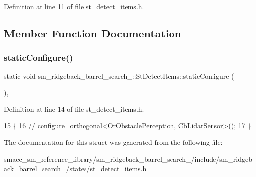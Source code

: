 Definition at line 11 of file st\+\_\+detect\+\_\+items.\+h.



\subsection{Member Function Documentation}
\mbox{\label{structsm__ridgeback__barrel__search__1_1_1StDetectItems_ac707db37c8932864cbf56191f468a507}} 
\subsubsection{\texorpdfstring{static\+Configure()}{staticConfigure()}}
{\footnotesize\ttfamily static void sm\+\_\+ridgeback\+\_\+barrel\+\_\+search\+\_\+::\+St\+Detect\+Items\+::static\+Configure (\begin{DoxyParamCaption}{ }\end{DoxyParamCaption})\hspace{0.3cm}{\ttfamily [inline]}, {\ttfamily [static]}}



Definition at line 14 of file st\+\_\+detect\+\_\+items.\+h.


\begin{DoxyCode}
15   \{
16     \textcolor{comment}{//   configure\_orthogonal<OrObstaclePerception, CbLidarSensor>();}
17   \}
\end{DoxyCode}


The documentation for this struct was generated from the following file\+:\begin{DoxyCompactItemize}
\item 
smacc\+\_\+sm\+\_\+reference\+\_\+library/sm\+\_\+ridgeback\+\_\+barrel\+\_\+search\+\_/include/sm\+\_\+ridgeback\+\_\+barrel\+\_\+search\+\_/states/\hyperlink{sm__ridgeback__barrel__search__1_2include_2sm__ridgeback__barrel__search__1_2states_2st__detect__items_8h}{st\+\_\+detect\+\_\+items.\+h}\end{DoxyCompactItemize}
